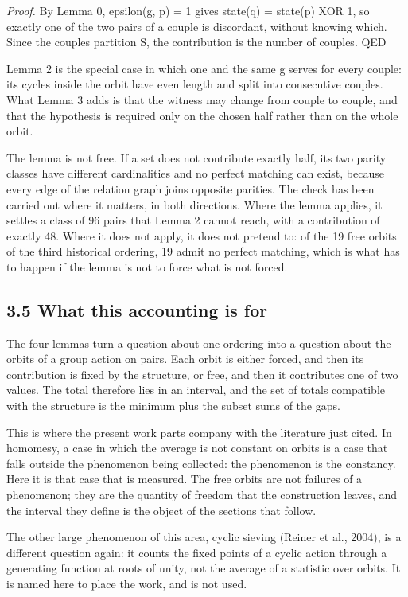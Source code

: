 \documentclass[11pt,a4paper]{article}
\begin{document}
\emph{Proof.} By Lemma 0, epsilon(g, p) = 1 gives state(q) = state(p) XOR 1, so exactly one of the two pairs of a couple is discordant, without knowing which. Since the couples partition S, the contribution is the number of couples. QED

Lemma 2 is the special case in which one and the same g serves for every couple: its cycles inside the orbit have even length and split into consecutive couples. What Lemma 3 adds is that the witness may change from couple to couple, and that the hypothesis is required only on the chosen half rather than on the whole orbit.

The lemma is not free. If a set does not contribute exactly half, its two parity classes have different cardinalities and no perfect matching can exist, because every edge of the relation graph joins opposite parities. The check has been carried out where it matters, in both directions. Where the lemma applies, it settles a class of 96 pairs that Lemma 2 cannot reach, with a contribution of exactly 48. Where it does not apply, it does not pretend to: of the 19 free orbits of the third historical ordering, 19 admit no perfect matching, which is what has to happen if the lemma is not to force what is not forced.

\subsection*{3.5 What this accounting is for}

The four lemmas turn a question about one ordering into a question about the orbits of a group action on pairs. Each orbit is either forced, and then its contribution is fixed by the structure, or free, and then it contributes one of two values. The total therefore lies in an interval, and the set of totals compatible with the structure is the minimum plus the subset sums of the gaps.

This is where the present work parts company with the literature just cited. In homomesy, a case in which the average is not constant on orbits is a case that falls outside the phenomenon being collected: the phenomenon is the constancy. Here it is that case that is measured. The free orbits are not failures of a phenomenon; they are the quantity of freedom that the construction leaves, and the interval they define is the object of the sections that follow.

The other large phenomenon of this area, cyclic sieving (Reiner et al., 2004), is a different question again: it counts the fixed points of a cyclic action through a generating function at roots of unity, not the average of a statistic over orbits. It is named here to place the work, and is not used.
\end{document}
